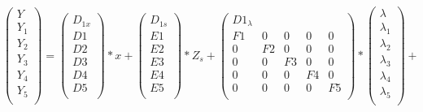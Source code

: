 \[\left(\begin{array}{c}
  Y\\
  \hline
   Y_{1} \\
   Y_{2} \\
   Y_{3} \\
   Y_{4} \\
   Y_{5} \\
\end{array}\right) =
\left(\begin{array}{c}
  D_{1x}\\
  \hline
  D1\\
  D2\\
  D3\\
  D4\\
  D5\\
\end{array}\right)*x +
\left(\begin{array}{c}
  D_{1s}\\
  \hline
  E1\\
  E2\\
  E3\\
  E4\\
  E5\\
\end{array}\right)*Z_{s} +
\left(\begin{array}{ccccc}
  D1_{\lambda}\\
  \hline
  F1&0&0&0&0\\
  0&F2&0&0&0\\
  0&0&F3&0&0\\
  0&0&0&F4&0\\
  0&0&0&0&F5\\
\end{array}\right)*
\left(\begin{array}{c}
  \lambda\\
  \hline
   \lambda _{1} \\
   \lambda _{2}\\
   \lambda _{3}\\
   \lambda _{4}\\
   \lambda _{5}\\
\end{array}\right)+\]
